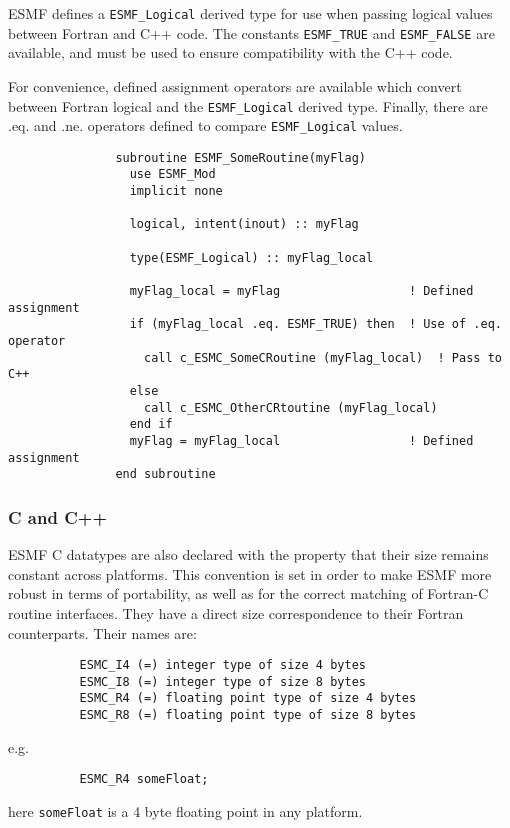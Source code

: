 ESMF defines a {\tt ESMF\_Logical} derived type for use when passing logical values between Fortran and C++ code.  The constants {\tt ESMF\_TRUE} and
{\tt ESMF\_FALSE} are available, and must be used to ensure compatibility with the C++ code.

For convenience, defined assignment operators are available which convert between Fortran logical and the {\tt ESMF\_Logical} derived type. 
Finally, there are .eq. and .ne. operators defined to compare {\tt ESMF\_Logical} values.

\begin{verbatim}
               subroutine ESMF_SomeRoutine(myFlag)
                 use ESMF_Mod
                 implicit none
		 
                 logical, intent(inout) :: myFlag
	       
                 type(ESMF_Logical) :: myFlag_local

                 myFlag_local = myFlag                  ! Defined assignment
                 if (myFlag_local .eq. ESMF_TRUE) then  ! Use of .eq. operator
                   call c_ESMC_SomeCRoutine (myFlag_local)  ! Pass to C++
                 else
                   call c_ESMC_OtherCRtoutine (myFlag_local)
                 end if
                 myFlag = myFlag_local                  ! Defined assignment
               end subroutine
\end{verbatim}

\subsubsection{C and C++}

ESMF C datatypes are also declared with the property that their size remains constant across platforms. This convention is set in order to make ESMF more robust in terms of portability, as well as for the correct matching of Fortran-C routine interfaces. They have a direct size correspondence to their Fortran counterparts. Their names are:

\begin{verbatim}   
          ESMC_I4 (=) integer type of size 4 bytes
          ESMC_I8 (=) integer type of size 8 bytes
          ESMC_R4 (=) floating point type of size 4 bytes
          ESMC_R8 (=) floating point type of size 8 bytes
\end{verbatim}

e.g.
\begin{verbatim}
          ESMC_R4 someFloat;
\end{verbatim}
here {\tt someFloat} is a 4 byte floating point in any platform.

